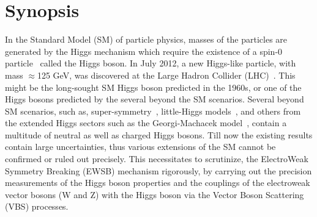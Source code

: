 \chapter*{Synopsis}
In the Standard Model (SM) of particle physics, masses of the particles are generated by the Higgs mechanism which require the existence of a spin-0 particle~\cite{Englert1964,Higgs1964,Higgs1964a,Guralnik1964,Higgs1966,Kibble1967} called the Higgs boson. In July 2012, a new Higgs-like particle, with mass $\approx$125 GeV, was discovered at the Large Hadron Collider (LHC)~\cite{Chatrchyan:2012xdj,Aad:2012tfa}. This might be the long-sought SM Higgs boson predicted in the 1960s, or one of the Higgs bosons predicted by the several beyond the SM scenarios. Several beyond SM scenarios, such as, super-symmetry~\cite{Martin1997,Djouadi2005a}, little-Higgs models~\cite{Han2003}, and others from the extended Higgs sectors such as the Georgi-Machacek model~\cite{GEORGI1985463}, contain a multitude of neutral as well as charged Higgs bosons. Till now the existing results contain large uncertainties, thus various extensions of the SM cannot be confirmed or ruled out precisely.
This necessitates to scrutinize, the ElectroWeak Symmetry Breaking (EWSB) mechanism rigorously, by carrying out the precision measurements of the Higgs boson properties and the couplings of the electroweak vector bosons (W and Z) with the Higgs boson via the Vector Boson Scattering (VBS) processes.

